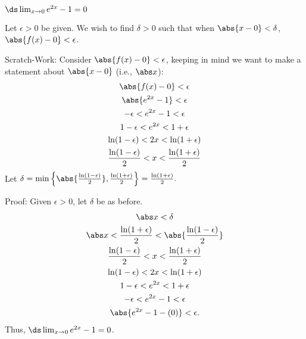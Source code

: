 {$\ds\lim_{x\to 0} e^{2x}-1 = 0$}
{Let $\epsilon >0$ be given. We wish to find $\delta >0$ such that when $\abs{x-0}<\delta$, $\abs{f(x)-0}<\epsilon$. 

Scratch-Work:
Consider $\abs{f(x)-0}<\epsilon$, keeping in  mind we want to make a statement about $\abs{x-0}$ (i.e., $\abs x$):
\begin{gather*}
\abs{f(x) -0 } < \epsilon \\
\abs{e^{2x}-1 }<\epsilon \\
-\epsilon< e^{2x}-1 < \epsilon \\
1-\epsilon< e^{2x} < 1+\epsilon \\
\ln (1-\epsilon) < 2x < \ln (1+\epsilon) \\
\frac{\ln (1-\epsilon)}{2} < x < \frac{\ln (1+\epsilon)}{2} \\
\end{gather*}
Let $\delta = \min\left\{\abs{\frac{\ln(1-\epsilon)}{2}},\frac{\ln(1+\epsilon)}{2}\right\}=\frac{\ln(1+\epsilon)}{2}.$

Proof: Given $\epsilon>0$, let $\delta$ be as before.
\begin{gather*}
\abs x < \delta \\
\abs x<\frac{\ln(1+\epsilon)}{2}<\abs{\frac{\ln(1-\epsilon)}{2}} \\
\frac{\ln(1-\epsilon)}{2} < x < \frac{\ln(1+\epsilon)}{2}\\
\ln(1-\epsilon)< 2x < \ln(1+\epsilon)\\
1-\epsilon < e^{2x} < 1+\epsilon\\
-\epsilon < e^{2x}-1 < \epsilon\\
\abs{e^{2x}-1-(0)} < \epsilon.
\end{gather*}
Thus, $\ds\lim_{x\to 0} e^{2x}-1 = 0$.}




